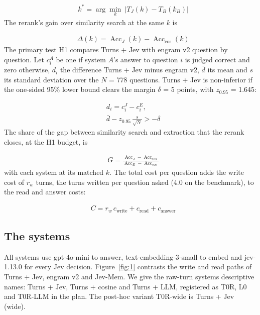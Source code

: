 \documentclass[11pt]{article}
\newcommand{\src}[1]{}
\begin{document}
\begin{align}
& k^{*} = \arg\min_{k}\ \bigl|T_{J}(k) - T_B(k_B)\bigr| \label{eq:match}
\end{align}
The rerank's gain over similarity search at the same $k$ is

\begin{align}
& \Delta(k) = \operatorname{Acc}_{J}(k) - \operatorname{Acc}_{\cos}(k) \label{eq:delta}
\end{align}
The primary test H1 compares Turns + Jev with engram v2 question by question. Let $c_i^A$ be one if system $A$'s answer to question $i$ is judged correct and zero otherwise, $d_i$ the difference Turns + Jev minus engram v2, $\bar d$ its mean and $s$ its standard deviation over the $N$ = 778\src{bench/results/v3/batch\_b\_report.json\#H1/questions} questions. Turns + Jev is non-inferior if the one-sided 95\% lower bound clears the margin $\delta$ = 5\src{docs/V3\_PLAN.md §1, §2, §4} points, with $z_{0.95}$ = 1.645:

\begin{align}
& d_i = c_i^{J} - c_i^{E}, \nonumber\\
& \bar d - z_{0.95}\, \frac{s}{\sqrt{N}} > -\delta \label{eq:primary}
\end{align}
The share of the gap between similarity search and extraction that the rerank closes, at the H1 budget, is

\begin{align}
& G = \frac{\operatorname{Acc}_{J} - \operatorname{Acc}_{\cos}}{\operatorname{Acc}_{E} - \operatorname{Acc}_{\cos}} \label{eq:gap}
\end{align}
with each system at its matched $k$. The total cost per question adds the write cost of $r_w$ turns, the turns written per question asked (4.0\src{bench/results/v3/batch\_b\_report.json\#write/engram v2/turns / 778} on the benchmark), to the read and answer costs:

\begin{align}
& C = r_w\, c_{\text{write}} + c_{\text{read}} + c_{\text{answer}} \label{eq:cost}
\end{align}
\subsection{The systems}\label{sec:3.2}
All systems use gpt-4o-mini to answer, text-embedding-3-small to embed and jev-1.13.0 for every Jev decision. Figure~\ref{fig:1} contrasts the write and read paths of Turns + Jev, engram v2 and Jev-Mem. We give the raw-turn systems descriptive names: Turns + Jev, Turns + cosine and Turns + LLM, registered as T0R, L0 and T0R-LLM in the plan. The post-hoc variant T0R-wide is Turns + Jev (wide).
\end{document}
